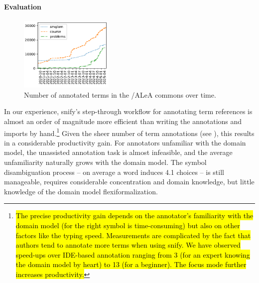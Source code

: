 \documentclass[runningheads]{llncs}
\def\edited#1{\hl{#1}}
\newcommand\ALeA{\textsf{ALeA}\xspace}
\newcommand\snify{\textsf{snify}\xspace}
\begin{document}
\paragraph{Evaluation}
\begin{figure}
    \vskip-1.2cm
  \centering
  \includegraphics[width=0.4\textwidth]{../img/annocounts.pdf}
    \vskip-0.2cm
  \caption{Number of annotated terms in the \sTeX/\ALeA commons over time.}\label{fig:annocounts}
  \vskip-0.7cm
\end{figure}
In our experience, \snify's step-through workflow for annotating term references 
is almost an order of magnitude more efficient than writing the
annotations and imports by hand.\footnote{
    \edited{
        The precise productivity gain depends on the annotator's
        familiarity with the domain model (for the right symbol
        is time-consuming) but also on other factors like
        the typing speed.
        Measurements are complicated by the fact that
        authors tend to annotate more terms when using \snify.
        We have observed speed-ups over IDE-based annotation
        ranging from 3 (for an expert knowing the domain model by heart)
        to 13 (for a beginner).
        The focus mode further increases productivity.
    }
}
Given the sheer number of term annotations (see ),
this results in a considerable productivity gain.
For annotators unfamiliar with the domain model, the unassisted annotation task is
almost infeasible, and the average unfamiliarity naturally grows with the domain
model. The symbol disambiguation process -- on average a word induces 4.1 choices
-- is still manageable,
requires considerable concentration and domain knowledge, but little knowledge of the
domain model flexiformalization.
\end{document}
